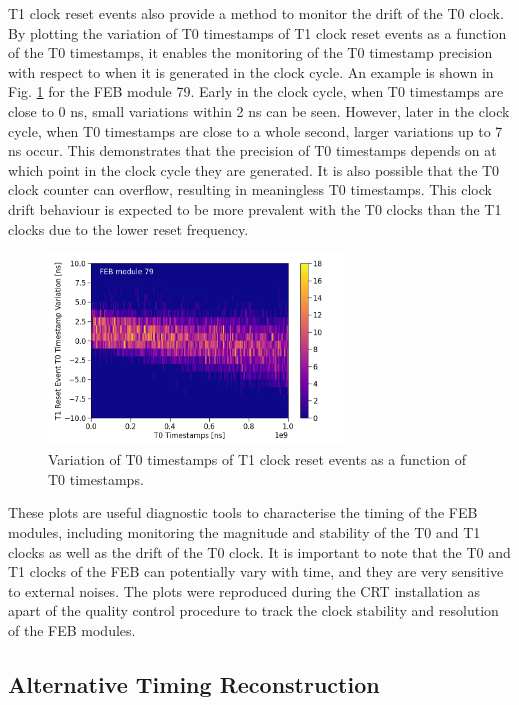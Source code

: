 T1 clock reset events also provide a method to monitor the drift of the T0 clock.
By plotting the variation of T0 timestamps of T1 clock reset events as a function of the T0 timestamps, it enables the monitoring of the T0 timestamp precision with respect to when it is generated in the clock cycle.
An example is shown in Fig. \ref{fig:Board79T1Drift2d} for the FEB module 79.
Early in the clock cycle, when T0 timestamps are close to 0 ns, small variations within 2 ns can be seen.
However, later in the clock cycle, when T0 timestamps are close to a whole second, larger variations up to 7 ns occur.
This demonstrates that the precision of T0 timestamps depends on at which point in the clock cycle they are generated.
It is also possible that the T0 clock counter can overflow, resulting in meaningless T0 timestamps.
This clock drift behaviour is expected to be more prevalent with the T0 clocks than the T1 clocks due to the lower reset frequency.

\begin{figure}[hb!] 
\centering    
\includegraphics[width=0.70\textwidth]{board79_T1drift_2d}
\caption[Variation of T0 Timestamps of T1 Clock Reset Events Against T0 Timestamp]{
Variation of T0 timestamps of T1 clock reset events as a function of T0 timestamps. 
}
\label{fig:Board79T1Drift2d}
\end{figure}

These plots are useful diagnostic tools to characterise the timing of the FEB modules, including monitoring the magnitude and stability of the T0 and T1 clocks as well as the drift of the T0 clock.
It is important to note that the T0 and T1 clocks of the FEB can potentially vary with time, and they are very sensitive to external noises. 
The plots were reproduced during the CRT installation as apart of the quality control procedure to track the clock stability and resolution of the FEB modules.

\subsection{Alternative Timing Reconstruction}
\label{sec:crt_time_alternative}

